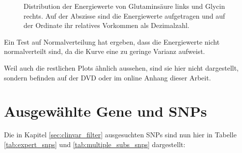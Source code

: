 \begin{figure}[H]
    \caption{Distribution der Energiewerte von Glutaminsäure links und Glycin rechts. Auf der Abszisse sind die Energiewerte aufgetragen und auf der Ordinate ihr relatives Vorkommen als Dezimalzahl.} 
    \label{fig:ep_as_distr}
\end{figure}

Ein Test auf Normalverteilung  hat ergeben, dass die Energiewerte nicht normalverteilt sind, da die Kurve eine zu geringe Varianz aufweist. 

Weil auch die restlichen Plots ähnlich aussehen, sind sie hier nicht dargestellt, sondern befinden auf der DVD oder im online Anhang dieser Arbeit.



\section{Ausgewählte Gene und SNPs}
Die in Kapitel \ref{sec:clinvar_filter} ausgesuchten \ac{SNP}s sind nun hier in Tabelle \ref{tab:expert_snps} und \ref{tab:multiple_subs_snps} dargestellt:


